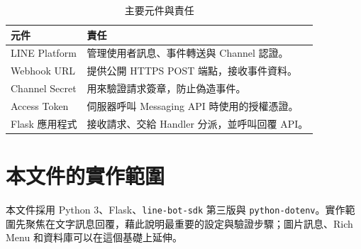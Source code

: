 \begin{table}[H]
    \centering
    \caption{主要元件與責任}
    \label{tab:components}
    \begin{tabular}{p{}p{}}
        \toprule
        元件 & 責任 \\
        \midrule
        LINE Platform & 管理使用者訊息、事件轉送與 Channel 認證。 \\
        Webhook URL & 提供公開 HTTPS POST 端點，接收事件資料。 \\
        Channel Secret & 用來驗證請求簽章，防止偽造事件。 \\
        Access Token & 伺服器呼叫 Messaging API 時使用的授權憑證。 \\
        Flask 應用程式 & 接收請求、交給 Handler 分派，並呼叫回覆 API。 \\
        \bottomrule
    \end{tabular}
\end{table}

\section{本文件的實作範圍}
本文件採用 Python 3、Flask、\texttt{line-bot-sdk} 第三版與 \texttt{python-dotenv}。實作範圍先聚焦在文字訊息回覆，藉此說明最重要的設定與驗證步驟；圖片訊息、Rich Menu 和資料庫可以在這個基礎上延伸。
